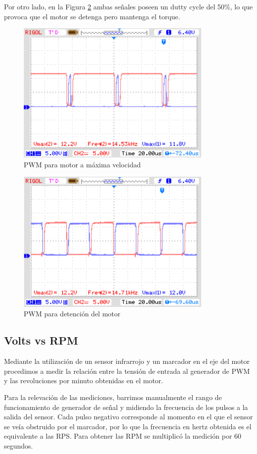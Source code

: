 \documentclass[11pt, a4paper]{article}
\begin{document}
Por otro lado, en la Figura \ref{fig:osc_min} ambas señales poseen un dutty cycle del 50\%, lo que provoca que el motor se detenga pero mantenga el torque.

\begin{figure}[h]
	\centering
	\includegraphics[width=9.5cm]{Imagenes/osc_max.png}
	\caption{PWM para motor a máxima velocidad}
	\label{fig:osc_max}
\end{figure} 



\begin{figure}[h]
	\centering
	\includegraphics[width=9.5cm]{Imagenes/osc_min.png}
	\caption{PWM para detención del motor}
	\label{fig:osc_min}
\end{figure} 

\subsection{Volts vs RPM}
Mediante la utilización de un sensor infrarrojo y un marcador en el eje del motor procedimos a medir la relación entre la tensión de entrada al generador de PWM y las revoluciones por minuto obtenidas en el motor.

Para la relevación de las mediciones, barrimos manualmente el rango de funcionamiento de generador de señal y midiendo la frecuencia de los pulsos a la salida del sensor. Cada pulso negativo corresponde al momento en el que el sensor se veía obstruido por el marcador, por lo que la frecuencia en hertz obtenida es el equivalente a las RPS. Para obtener las RPM se multiplicó la medición por 60 segundos.
\end{document}

